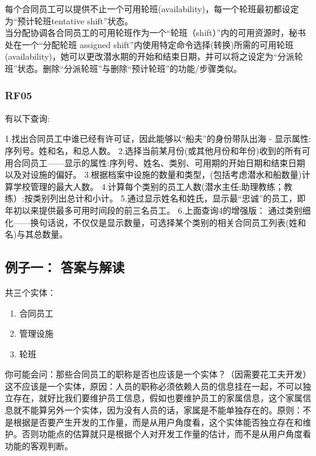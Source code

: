 每个合同员工可以提供不止一个可用轮班(availability)，每一个轮班最初都设定为“预计轮班tentative shift”状态。\\
当分配协调各合同员工的可用轮班作为一个“轮班（shift）”内的可用资源时，秘书处在一个“分配轮班 assigned shift”内使用特定命令选择(转换)所需的可用轮班(availability)，她可以更改潜水期的开始和结束日期，并可以将之设定为“分派轮班”状态。删除“分派轮班”与删除“预计轮班”的功能/步骤类似。 \\


\hypertarget{ux63a5ux4e58ux5ba2}{%
\subsubsection{RF05}\label{ux63a5ux4e58ux5ba2}}

有以下查询:

1.找出合同员工中谁已经有许可证，因此能够以“船夫”的身份带队出海 - 显示属性:序列号。姓和名，和总人数。
2.选择当前某月份(或其他月份和年份)收到的所有可用合同员工——显示的属性:序列号、姓名、类别、可用期的开始日期和结束日期以及对设施的偏好。
3.根据档案中设施的数量和类型，(包括考虑潜水和船数量)计算学校管理的最大人数。
4.计算每个类别的员工人数(潜水主任;助理教练；教练）:按类别列出总计和小计。
5.通过显示姓名和姓氏，显示最“忠诚”的员工，即年初以来提供最多可用时间段的前三名员工。
6.上面查询4的增强版： 通过类别细化——换句话说，不仅仅是显示数量，可选择某个类别的相关合同员工列表(姓和名)与其总数量。


\hypertarget{ux4f8bux5b50ux4e00-ux7b54ux6848ux4e0eux89e3ux8bfb}{%
\subsection{例子一：
答案与解读}\label{ux4f8bux5b50ux4e00-ux7b54ux6848ux4e0eux89e3ux8bfb}}

共三个实体：

\begin{enumerate}
\tightlist
\item
  合同员工
\item
  管理设施
\item
  轮班
\end{enumerate}

你可能会问：那些合同员工的职称是否也应该是一个实体？（因需要花工夫开发）\\
这不应该是一个实体，原因：人员的职称必须依赖人员的信息挂在一起，不可以独立存在，就好比我们要维护员工信息，假如也要维护员工的家属信息，这个家属信息就不能算另外一个实体，因为没有人员的话，家属是不能单独存在的。原则：不是根据是否要产生开发的工作量，而是从用户角度看，这个实体能否独立存在和维护。否则功能点的估算就只是根据个人对开发工作量的估计，而不是从用户角度看功能的客观判断。

